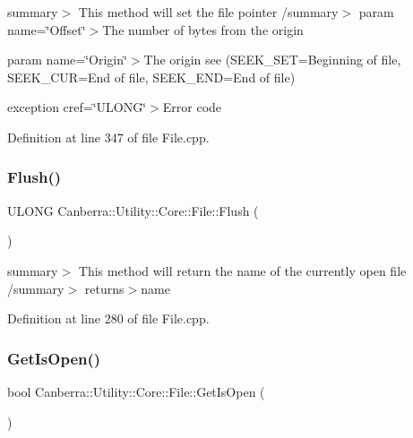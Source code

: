 summary$>$ This method will set the file pointer /summary$>$ param name=\char`\"{}\+Offset\char`\"{}$>$The number of bytes from the origin

param name=\char`\"{}\+Origin\char`\"{}$>$The origin see (S\+E\+E\+K\+\_\+\+S\+ET=Beginning of file, S\+E\+E\+K\+\_\+\+C\+UR=End of file, S\+E\+E\+K\+\_\+\+E\+ND=End of file)

exception cref=\char`\"{}\+U\+L\+O\+N\+G\char`\"{}$>$Error code

Definition at line 347 of file File.\+cpp.

\mbox{\label{class_canberra_1_1_utility_1_1_core_1_1_file_ae4049e5cb4d9107a5a3df2548511fb10_ae4049e5cb4d9107a5a3df2548511fb10}} 
\subsubsection{\texorpdfstring{Flush()}{Flush()}}
{\footnotesize\ttfamily U\+L\+O\+NG Canberra\+::\+Utility\+::\+Core\+::\+File\+::\+Flush (\begin{DoxyParamCaption}{ }\end{DoxyParamCaption})}

summary$>$ This method will return the name of the currently open file /summary$>$ returns$>$name

Definition at line 280 of file File.\+cpp.

\mbox{\label{class_canberra_1_1_utility_1_1_core_1_1_file_abf3cd9f9ffc13bafcc3b199c15af4f02_abf3cd9f9ffc13bafcc3b199c15af4f02}} 
\subsubsection{\texorpdfstring{Get\+Is\+Open()}{GetIsOpen()}}
{\footnotesize\ttfamily bool Canberra\+::\+Utility\+::\+Core\+::\+File\+::\+Get\+Is\+Open (\begin{DoxyParamCaption}{ }\end{DoxyParamCaption})}

